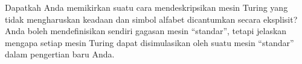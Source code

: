 \documentclass[../../../include/open-logic-section]{subfiles}
\begin{document}
\begin{prob}
  Dapatkah Anda memikirkan suatu cara mendeskripsikan mesin Turing yang tidak
  mengharuskan keadaan dan simbol alfabet dicantumkan secara eksplisit? Anda
  boleh mendefinisikan sendiri gagasan mesin ``standar'', tetapi jelaskan
  mengapa setiap mesin Turing dapat disimulasikan oleh suatu mesin ``standar''
  dalam pengertian baru Anda.
\end{prob}
\end{document}
